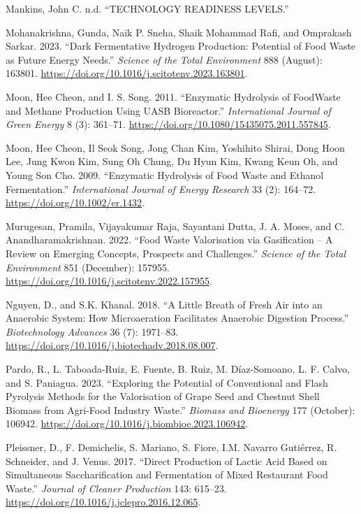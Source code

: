\documentclass[11pt]{report}
\begin{document}
\begin{hangparas}{1.5em}{1}
\hypertarget{citeproc_bib_item_22}{Mankins, John C. n.d. “TECHNOLOGY READINESS LEVELS.”}

\hypertarget{citeproc_bib_item_23}{Mohanakrishna, Gunda, Naik P. Sneha, Shaik Mohammad Rafi, and Omprakash Sarkar. 2023. “Dark Fermentative Hydrogen Production: Potential of Food Waste as Future Energy Needs.” \textit{Science of the Total Environment} 888 (August): 163801. \url{https://doi.org/10.1016/j.scitotenv.2023.163801}.}

\hypertarget{citeproc_bib_item_24}{Moon, Hee Cheon, and I. S. Song. 2011. “Enzymatic Hydrolysis of FoodWaste and Methane Production Using UASB Bioreactor.” \textit{International Journal of Green Energy} 8 (3): 361–71. \url{https://doi.org/10.1080/15435075.2011.557845}.}

\hypertarget{citeproc_bib_item_25}{Moon, Hee Cheon, Il Seok Song, Jong Chan Kim, Yoshihito Shirai, Dong Hoon Lee, Jung Kwon Kim, Sung Oh Chung, Du Hyun Kim, Kwang Keun Oh, and Young Son Cho. 2009. “Enzymatic Hydrolysis of Food Waste and Ethanol Fermentation.” \textit{International Journal of Energy Research} 33 (2): 164–72. \url{https://doi.org/10.1002/er.1432}.}

\hypertarget{citeproc_bib_item_26}{Murugesan, Pramila, Vijayakumar Raja, Sayantani Dutta, J. A. Moses, and C. Anandharamakrishnan. 2022. “Food Waste Valorisation via Gasification – A Review on Emerging Concepts, Prospects and Challenges.” \textit{Science of the Total Environment} 851 (December): 157955. \url{https://doi.org/10.1016/j.scitotenv.2022.157955}.}

\hypertarget{citeproc_bib_item_27}{Nguyen, D., and S.K. Khanal. 2018. “A Little Breath of Fresh Air into an Anaerobic System: How Microaeration Facilitates Anaerobic Digestion Process.” \textit{Biotechnology Advances} 36 (7): 1971–83. \url{https://doi.org/10.1016/j.biotechadv.2018.08.007}.}

\hypertarget{citeproc_bib_item_28}{Pardo, R., L. Taboada-Ruiz, E. Fuente, B. Ruiz, M. Díaz-Somoano, L. F. Calvo, and S. Paniagua. 2023. “Exploring the Potential of Conventional and Flash Pyrolysis Methods for the Valorisation of Grape Seed and Chestnut Shell Biomass from Agri-Food Industry Waste.” \textit{Biomass and Bioenergy} 177 (October): 106942. \url{https://doi.org/10.1016/j.biombioe.2023.106942}.}

\hypertarget{citeproc_bib_item_29}{Pleissner, D., F. Demichelis, S. Mariano, S. Fiore, I.M. Navarro Gutiérrez, R. Schneider, and J. Venus. 2017. “Direct Production of Lactic Acid Based on Simultaneous Saccharification and Fermentation of Mixed Restaurant Food Waste.” \textit{Journal of Cleaner Production} 143: 615–23. \url{https://doi.org/10.1016/j.jclepro.2016.12.065}.}


\end{hangparas}
\end{document}
